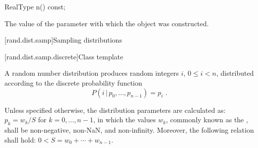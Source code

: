 %
\begin{itemdecl}
RealType n() const;
\end{itemdecl}

\begin{itemdescr}
\pnum\returns The value of the  parameter
 with which the object was constructed.
\end{itemdescr}%
%



[rand.dist.samp]{Sampling distributions}%
%



[rand.dist.samp.discrete]{Class template }%
%
%

\pnum
A  random number distribution
produces random integers $i$, $0 \leq i < n$,
distributed according to
the discrete probability function%
%
%
\[  P(i \,|\, p_0, \dotsc, p_{n-1}) = p_i \text{ .} \]

\pnum
Unless specified otherwise,
the distribution parameters are calculated as:
$p_k = {w_k / S}$ for $k = 0, \dotsc, n - 1$,
in which the values $w_k$,
commonly known as the %
%
%
, shall be non-negative, non-NaN, and non-infinity.
Moreover, the following relation shall hold:
$0 < S = w_0 + \dotsb + w_{n - 1}$.

